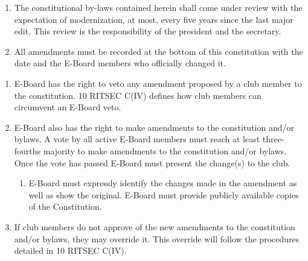 


\begin{enumerate}
  \item The constitutional by-laws contained herein shall come under review
    with the expectation of modernization, at most, every five years since the
    last major edit. This review is the responsibility of the president and the
    secretary.
  \item All amendments must be recorded at the bottom of this constitution with
    the date and the E-Board members who officially changed it.
\end{enumerate}


\begin{enumerate}
  \item E-Board has the right to veto any amendment proposed by a club member
    to the constitution. 10 RITSEC C(IV) defines how club members can circumvent
    an E-Board veto.
  \item E-Board also has the right to make amendments to the constitution
    and/or bylaws. A vote by all active E-Board members must reach at least
    three-fourths majority to make amendments to the constitution and/or
    bylaws. Once the vote has passed E-Board must present the change(s) to the
    club.
  \begin{enumerate}
    \item E-Board must expressly identify the changes made in the amendment as
      well as show the original. E-Board must provide publicly available copies
      of the Constitution.
  \end{enumerate}
  \item If club members do not approve of the new amendments to the
    constitution and/or bylaws, they may override it. This override will follow
    the procedures detailed in 10 RITSEC C(IV).
\end{enumerate}


